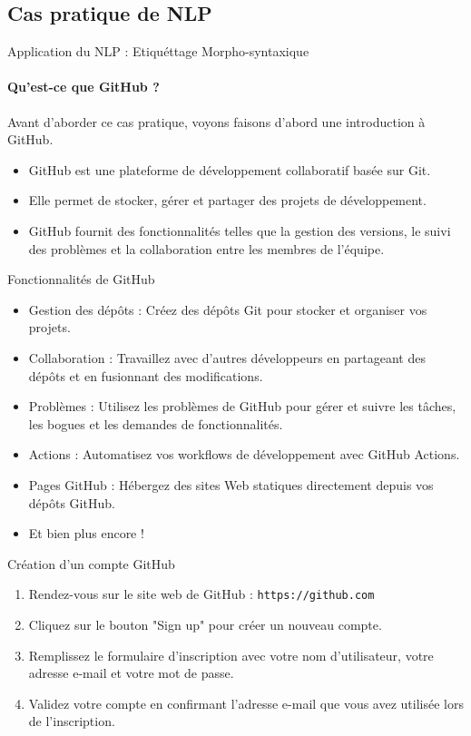 \documentclass{beamer}
\begin{document}
\subsection{Cas pratique de NLP}
\begin{frame}{Application du NLP : Etiquéttage Morpho-syntaxique}
	\framesubtitle{Qu'est-ce que GitHub ?}
	Avant d'aborder ce cas pratique, voyons faisons d'abord une introduction à GitHub.
	\begin{itemize}
		\item GitHub est une plateforme de développement collaboratif basée sur Git.
		\item Elle permet de stocker, gérer et partager des projets de développement.
		\item GitHub fournit des fonctionnalités telles que la gestion des versions, le suivi des problèmes et la collaboration entre les membres de l'équipe.
	\end{itemize}
\end{frame}

\begin{frame}{Fonctionnalités de GitHub}
	\begin{itemize}
		\item Gestion des dépôts : Créez des dépôts Git pour stocker et organiser vos projets.
		\item Collaboration : Travaillez avec d'autres développeurs en partageant des dépôts et en fusionnant des modifications.
		\item Problèmes : Utilisez les problèmes de GitHub pour gérer et suivre les tâches, les bogues et les demandes de fonctionnalités.
		\item Actions : Automatisez vos workflows de développement avec GitHub Actions.
		\item Pages GitHub : Hébergez des sites Web statiques directement depuis vos dépôts GitHub.
		\item Et bien plus encore !
	\end{itemize}
\end{frame}

\begin{frame}{Création d'un compte GitHub}
	\begin{enumerate}
		\item Rendez-vous sur le site web de GitHub : \texttt{https://github.com}
		\item Cliquez sur le bouton "Sign up" pour créer un nouveau compte.
		\item Remplissez le formulaire d'inscription avec votre nom d'utilisateur, votre adresse e-mail et votre mot de passe.
		\item Validez votre compte en confirmant l'adresse e-mail que vous avez utilisée lors de l'inscription.
	\end{enumerate}
\end{frame}
\end{document}
